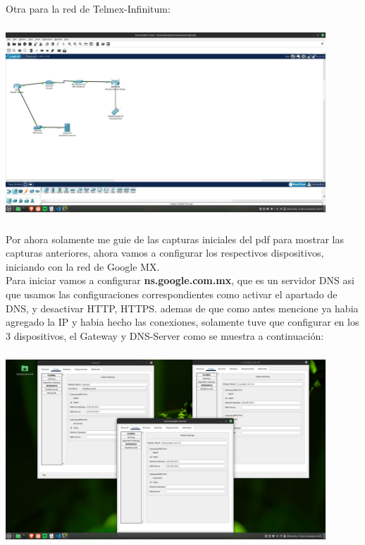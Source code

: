\documentclass[14pt]{book}
\begin{document}
Otra para la red de Telmex-Infinitum:\\

\includegraphics[width=12cm, height=8cm]{images/telmexred.png}\\

Por ahora solamente me guie de las capturas iniciales del pdf para mostrar las capturas anteriores, ahora vamos a configurar los respectivos dispositivos, iniciando con la red de Google MX.\\

Para iniciar vamos a configurar \textbf{ns.google.com.mx}, que es un servidor DNS asi que usamos las configuraciones correspondientes como activar el apartado de DNS, y desactivar HTTP, HTTPS. ademas de que como antes mencione ya habia agregado la IP y habia hecho las conexiones,
solamente tuve que configurar en los 3 dispositivos, el Gateway y DNS-Server como se muestra a continuación:\\

\includegraphics[width=12cm, height=8cm]{images/dnsconfiguaracion.png}\\
\end{document}
